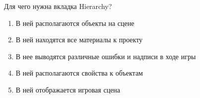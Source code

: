
Для чего нужна вкладка Hierarchy?

\begin{enumerate}
    \item В ней располагаются объекты на сцене
    \item В ней находятся все материалы к проекту
    \item В нее выводятся различные ошибки и надписи в ходе игры
    \item В ней располагаются свойства к объектам
    \item В ней отображается игровая сцена
\end{enumerate}